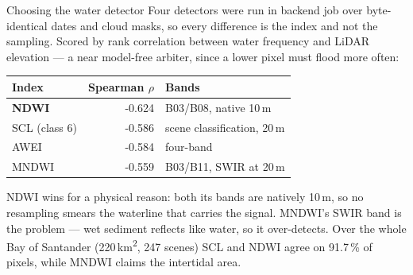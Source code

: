 \begin{pblock}{Choosing the water detector}
Four detectors were run in  backend job over byte-identical dates
and cloud masks, so every difference is the index and not the sampling.
Scored by rank correlation between water frequency and LiDAR elevation —
a near model-free arbiter, since a lower pixel must flood more often:

\vspace{3mm}
\begin{tabular}{@{}l r l@{}}
\toprule
Index & {Spearman $\rho$} & Bands \\
\midrule
\textbf{NDWI}  & -0.624 & B03/B08, native 10\,m \\
SCL (class 6)  & -0.586 & scene classification, 20\,m \\
AWEI           & -0.584 & four-band \\
MNDWI          & -0.559 & B03/B11, SWIR at 20\,m \\
\bottomrule
\end{tabular}

\vspace{5mm}
NDWI wins for a physical reason: both its bands are natively 10\,m,
so no resampling smears the waterline that carries the signal. MNDWI's SWIR
band is the problem — wet sediment reflects like water, so it over-detects.
Over the whole Bay of Santander (220\,km\textsuperscript{2}, 247
scenes) SCL and NDWI agree on 91.7\,\% of pixels, while MNDWI
claims  the intertidal area.

\vspace{4mm}
\end{pblock}
